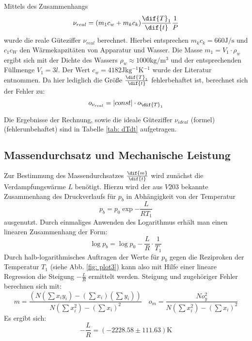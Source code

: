 Mittels des Zusammenhangs
\begin{equation}
  \nu_{real} = (m_1 c_w + m_k c_k) \frac{\dif{T}_1}{\dif{t}} \frac{1}{P} %
\end{equation}
wurde die reale Güteziffer $\nu_{real}$ berechnet. Hierbei entsprechen $m_k c_k = 660 \si{\joule \per \second}$ und $c_1 c_W$ den Wärmekapzitäten von Apparatur und Wasser. Die Masse $m_1 = V_1 \cdot \rho_w$ ergibt sich mit
der Dichte des Wassers $\rho_w \approx 1000 \si{\kilo \gram \per \meter ^3}$  und der entsprechenden Füllmenge $V_1 = 3 l$. Der Wert $c_w = 4182\si{\joule \kilo \gram^{-1} \kelvin^{-1}}$ wurde der Literatur \cite{demtröder} entnommen. %
Da hier lediglich die Größe $\frac{\dif{T}_1}{\dif{t}}$ fehlerbehaftet ist, berechnet sich der Fehler zu: %
\begin{equation}
  o_{\nu_{real}} = \left| const \right| \cdot o_{\dif{T}_1} %
  \label{eq: errorconst}
\end{equation}

Die Ergebnisse der Rechnung, sowie die ideale Güteziffer $\nu_{ideal}$ (formel) (fehlerunbehaftet) sind in Tabelle \ref{tab: dTdt} aufgetragen.


\subsection{Massendurchsatz und Mechanische Leistung}
Zur Bestimmung des Massendurchsatzes $\frac{\dif{m}}{\dif{t}}$ wird zunächst die Verdampfungswärme $L$ benötigt. Hierzu wird der aus $V203$ \cite{anleitung203} bekannte Zusammenhang des Druckverlaufs für $p_b$ in Abhängigkeit von der Temperatur%
\begin{equation}
  p_b = p_0 \exp{-\frac{L}{R T_1}} %
\end{equation}
ausgenutzt. Durch einmaliges Anwenden des Logarithmus erhält man einen linearen Zusammenhang der Form:
\begin{equation}
  \log{p_b} = \log{p_0} -\frac{L}{R} \cdot \frac{1}{T_1}
\end{equation}
Durch halb-logarithmisches Auftragen der Werte für $p_b$ gegen die Reziproken der Temperatur $T_1$ (siehe Abb. \ref{fig: plot3}) kann also mit Hilfe einer lineare Regression die Steigung $-\frac{L}{R}$ ermittelt werden.
Steigung und zugehöriger Fehler berechnen sich mit:
\begin{equation}
  m= \frac{\left( N  (\sum x_i y_i) - (\sum x_i)(\sum y_i)\right)}{N (\sum x_i^2)- (\sum x_i)^2 }    \quad   o_m=\frac{N o_y^2}{N (\sum x_i^2)- (\sum x_i)^2 }
\end{equation}
Es ergibt sich:
\begin{equation}
  -\frac{L}{R} =  (-2228.58 \pm 111.63) \si{\kelvin}
\end{equation}

